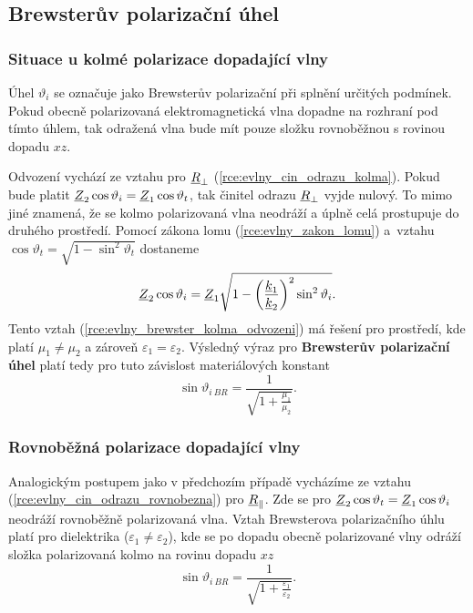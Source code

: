 \subsection{Brewsterův polarizační úhel}
\subsubsection*{Situace u kolmé polarizace dopadající vlny}
Úhel $\vartheta_{i}$ se označuje jako Brewsterův polarizační při splnění určitých podmínek. Pokud obecně polarizovaná elektromagnetická vlna dopadne na rozhraní pod tímto úhlem, tak odražená vlna bude mít pouze složku rovnoběžnou s rovinou dopadu $xz$.

Odvození vychází ze vztahu pro ${\underline{R}}_{\perp}$ (\ref{rce:evlny_cin_odrazu_kolma}). Pokud bude platit ${\underline{Z}}_{2}\cos\vartheta_{i} = {\underline{Z}}_{1}\cos\vartheta_{t}$, tak činitel odrazu ${\underline{R}}_{\perp}$ vyjde nulový. To mimo jiné znamená, že se kolmo polarizovaná vlna neodráží a úplně celá prostupuje do druhého prostředí. Pomocí zákona lomu (\ref{rce:evlny_zakon_lomu}) a~vztahu $\cos\vartheta_{t} = \sqrt{1-\sin^{2}\vartheta_{t}}$ dostaneme
\begin{equation}
	{\underline{Z}}_{2}\cos\vartheta_{i} = {\underline{Z}}_{1}\sqrt{1-\bigg(\frac{{\underline{k}}_{1}}{{\underline{k}}_{2}}\bigg)^{2}\sin^{2}\vartheta_{i}}.
	\label{rce:evlny_brewster_kolma_odvozeni}
\end{equation}
Tento vztah (\ref{rce:evlny_brewster_kolma_odvozeni}) má řešení pro prostředí, kde platí $\mu_{1} \ne \mu_{2}$ a zároveň $\varepsilon_{1} = \varepsilon_{2}$. Výsledný výraz pro {\bf Brewsterův polarizační úhel} platí tedy pro tuto závislost materiálových konstant
\begin{equation}
	\sin\vartheta_{i\ BR} = \frac{1}{\sqrt{1+\frac{\mu_{1}}{\mu_{2}}}}.
	\label{rce:evlny_brewster_kolma}
\end{equation}

\subsubsection*{Rovnoběžná polarizace dopadající vlny}
Analogickým postupem jako v předchozím případě vycházíme ze vztahu (\ref{rce:evlny_cin_odrazu_rovnobezna}) pro ${\underline{R}}_{\parallel}$. Zde se pro ${\underline{Z}}_{2}\cos\vartheta_{t} = {\underline{Z}}_{1}\cos\vartheta_{i}$ neodráží rovnoběžně polarizovaná vlna. Vztah Brewsterova polarizačního úhlu platí pro dielektrika ($\varepsilon_{1} \ne \varepsilon_{2}$), kde se po dopadu obecně polarizované vlny odráží složka polarizovaná kolmo na rovinu dopadu $xz$
\begin{equation}
	\sin\vartheta_{i\ BR} = \frac{1}{\sqrt{1+\frac{\varepsilon_{1}}{\varepsilon_{2}}}}.
	\label{rce:evlny_brewster_kolma}
\end{equation}
\newpage

